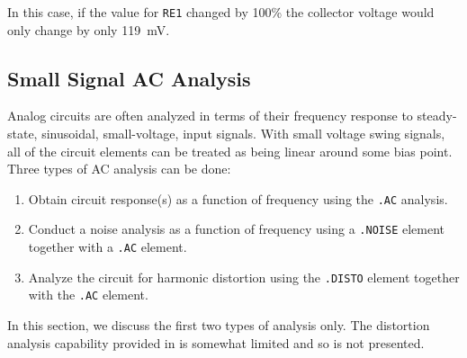 In this case, if the value for {\tt RE1} changed by 100\% the collector voltage
would only change by only 119~mV.

\subsection{Small Signal AC Analysis}

Analog circuits are often analyzed in terms of their frequency response to
steady-state, sinusoidal, small-voltage, input signals.
With small voltage swing signals, all of the circuit elements can be treated
as being linear  around some bias point.
Three types of AC analysis can be done:
\begin{enumerate}
  \item Obtain circuit response(s) as a function of frequency using
    the {\tt .AC} analysis.
  \item Conduct a noise analysis as a function of frequency using
    a {\tt .NOISE} element together with a {\tt .AC} element.
  \item Analyze the circuit for harmonic distortion using the
    {\tt .DISTO} element together with the {\tt .AC} element.
\end{enumerate}
In this section, we discuss the first two types of analysis only.
The distortion analysis capability provided in \spicetwo is somewhat limited
and so is not presented.

